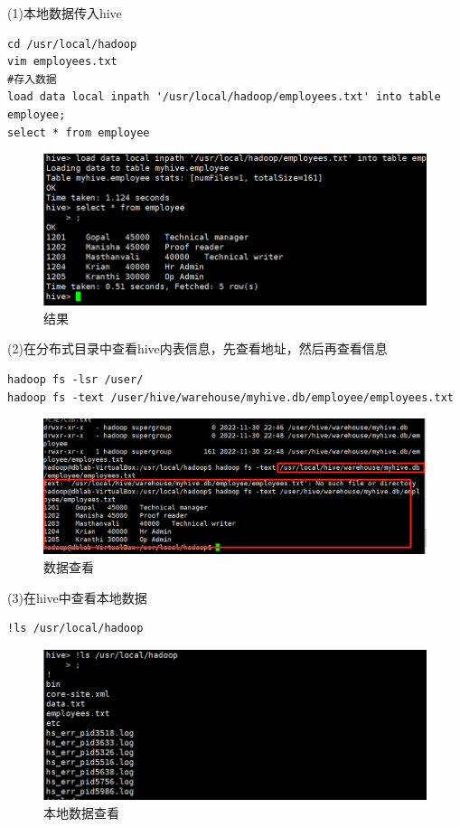 \documentclass[12pt]{article}
\begin{document}
(1)本地数据传入hive

\begin{lstlisting}[language={[ANSI]C}]
cd /usr/local/hadoop
vim employees.txt
#存入数据
load data local inpath '/usr/local/hadoop/employees.txt' into table employee;
select * from employee
\end{lstlisting}

\begin{figure}[ht]
\centering
\includegraphics[scale=1.0]{figures/17.png}
\caption{结果}\label{fig:label2}
\end{figure}

(2)在分布式目录中查看hive内表信息，先查看地址，然后再查看信息

\begin{lstlisting}[language={[ANSI]C}]
hadoop fs -lsr /user/
hadoop fs -text /user/hive/warehouse/myhive.db/employee/employees.txt
\end{lstlisting}

\begin{figure}[ht]
\centering
\includegraphics[scale=0.8]{figures/18.png}
\caption{数据查看}\label{fig:label2}
\end{figure}

\newpage
(3)在hive中查看本地数据

\begin{lstlisting}[language={[ANSI]C}]
!ls /usr/local/hadoop
\end{lstlisting}

\begin{figure}[ht]
\centering
\includegraphics[scale=1.0]{figures/19.png}
\caption{本地数据查看}\label{fig:label2}
\end{figure}
\end{document}
